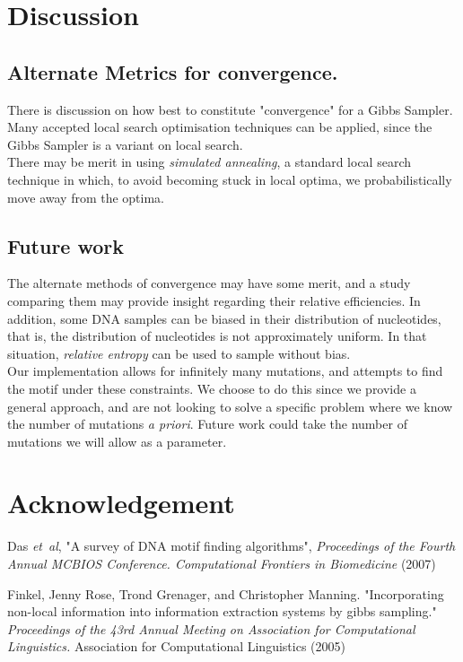 \documentclass{bioinfo}
\begin{document}
\section{Discussion}
\subsection{Alternate Metrics for convergence.}
There is discussion on how best to constitute "convergence" for a Gibbs Sampler.
Many accepted local search optimisation techniques can be applied, since the Gibbs Sampler is a variant on local search.\\
There may be merit in using \textit{simulated annealing}, a standard local search technique in which, to avoid becoming stuck in local optima, we probabilistically move away from the optima. \citealp{Finkel}

\subsection{Future work}
The alternate methods of convergence may have some merit, and a study comparing them may provide insight regarding their relative efficiencies. In addition, some DNA samples can be biased in their distribution of nucleotides, that is, the distribution of nucleotides is not approximately uniform. In that situation, \textit{relative entropy} can be used to sample without bias. \\
Our implementation allows for infinitely many mutations, and attempts to find the motif under these constraints. We choose to do this since we provide a general approach, and are not looking to solve a specific problem where we know the number of mutations \textit{a priori}. Future work could take the number of mutations we will allow as a parameter.

\section*{Acknowledgement}

%
%
%
%

%
%
%
%

\begin{thebibliography}{}
    Das \textit{et~al}, "A survey of DNA motif finding algorithms", \textit{Proceedings of the Fourth Annual MCBIOS Conference. Computational Frontiers in Biomedicine} (2007)

    Finkel, Jenny Rose, Trond Grenager, and Christopher Manning. "Incorporating non-local information into information extraction systems by gibbs sampling." \textit{Proceedings of the 43rd Annual Meeting on Association for Computational Linguistics.} Association for Computational Linguistics (2005)
\end{thebibliography}
\end{document}
